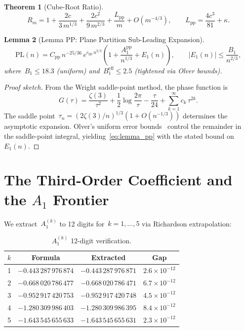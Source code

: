 \documentclass[11pt,a4paper]{article}
\newtheorem{theorem}{Theorem}[section]
\newtheorem{lemma}[theorem]{Lemma}
\begin{document}
\begin{theorem}[Cube-Root Ratio]\label{thm:cuberoot}
\begin{equation}\label{eq:cuberoot}
  R_m = 1 + \frac{2c}{3\,m^{1/3}} + \frac{2c^2}{9\,m^{2/3}} + \frac{L_{\mathrm{pp}}}{m} + O(m^{-4/3}),
  \qquad L_{\mathrm{pp}} = \frac{4c^3}{81} + \kappa.
\end{equation}
\end{theorem}

\begin{lemma}[Lemma PP: Plane Partition Sub-Leading Expansion]\label{lem:pp}
\begin{equation}\label{eq:lemma_pp}
  \mathrm{PL}(n) = C_{\mathrm{pp}}\,n^{-25/36}\,e^{c_{\mathrm{pp}}\,n^{2/3}}\!\left(1 + \frac{A_1^{\mathrm{pp}}}{n^{1/3}} + E_1(n)\right),
  \qquad |E_1(n)| \leq \frac{B_1}{n^{2/3}},
\end{equation}
where~$B_1 \leq 18.3$ (uniform) and~$B_1^{\mathrm{eff}} \leq 2.5$ (tightened via Olver bounds).
\end{lemma}

\begin{proof}[Proof sketch]
From the Wright saddle-point method, the phase function is
\[
  G(\tau) = \frac{\zeta(3)}{\tau^2} + \frac{1}{2}\log\frac{2\pi}{\tau} - \frac{\tau}{24} + \sum_{k=1}^{\infty} c_k\,\tau^{2k}.
\]
The saddle point~$\tau_n = (2\zeta(3)/n)^{1/3}(1 + O(n^{-1/3}))$ determines the asymptotic expansion. Olver's uniform error bounds~\cite{olver1974} control the remainder in the saddle-point integral, yielding~\eqref{eq:lemma_pp} with the stated bound on~$E_1(n)$.
\end{proof}

\section{The Third-Order Coefficient and the \texorpdfstring{$A_1$}{A1} Frontier}\label{sec:A1}

We extract~$A_1^{(k)}$ to 12 digits for~$k = 1, \ldots, 5$ via Richardson extrapolation:

\begin{table}[ht]
\centering
\caption{$A_1^{(k)}$ 12-digit verification.}
\label{tab:A1}
\begin{tabular}{@{}cccc@{}}
\toprule
$k$ & Formula & Extracted & Gap \\
\midrule
1 & $-0.443\,287\,976\,874$ & $-0.443\,287\,976\,871$ & $2.6\times 10^{-12}$ \\
2 & $-0.668\,020\,786\,477$ & $-0.668\,020\,786\,471$ & $6.7\times 10^{-12}$ \\
3 & $-0.952\,917\,420\,753$ & $-0.952\,917\,420\,748$ & $4.5\times 10^{-12}$ \\
4 & $-1.280\,309\,986\,403$ & $-1.280\,309\,986\,395$ & $8.4\times 10^{-12}$ \\
5 & $-1.643\,545\,655\,633$ & $-1.643\,545\,655\,631$ & $2.3\times 10^{-12}$ \\
\bottomrule
\end{tabular}
\end{table}
\end{document}
